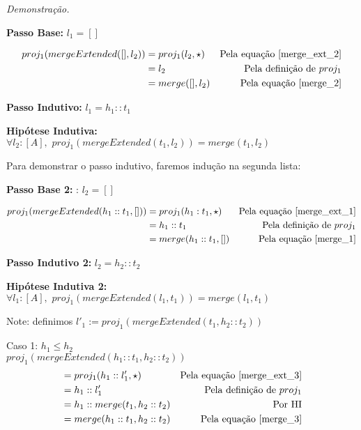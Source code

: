 \documentclass[12pt, oneside, a4paper,english,brazil]{abntex2}
\begin{document}
\noindent \textit{Demonstra\c{c}\~ao.}

\textbf{Passo Base: } $l_{1} = []$

\begin{align*}
  proj_{1}(mergeExtended([], l_{2})) &= proj_{1}(l_{2}, \star) &\text{Pela equa\c{c}\~ao \ref{merge_ext_2}} \\
  &= l_{2} &\text{Pela defini\c{c}\~ao de } proj_1\\
  &= merge([], l_{2}) &\text{Pela equa\c{c}\~ao \ref{merge_2}}
\end{align*}

\textbf{Passo Indutivo: } $l_{1} = h_{1} :: t_{1}$

\textbf{Hip\'otese Indutiva: } $\forall l_{2} : [A], \,\, proj_{1}(mergeExtended(t_{1}, l_{2})) = merge(t_{1}, l_{2})$

Para demonstrar o passo indutivo, faremos indu\c{c}\~ao na segunda lista:

\textbf{Passo Base 2: }: $l_{2} = []$

\begin{align*}
  proj_{1}(mergeExtended(h_{1} :: t_{1}, [])) &= proj_{1}(h_{1} : t_{1}, \star) &\text{Pela equa\c{c}\~ao \ref{merge_ext_1}} \\
  &= h_{1} :: t_{1} &\text{Pela defini\c{c}\~ao de } proj_1 \\
  &= merge(h_{1} :: t_{1}, []) &\text{Pela equa\c{c}\~ao \ref{merge_1}}
\end{align*}

\textbf{Passo Indutivo 2: } $l_{2} = h_{2} :: t_{2}$

\textbf{Hip\'otese Indutiva 2: } $\forall l_{1} : [A], \,\, proj_{1}(mergeExtended(l_{1}, t_{1})) = merge(l_{1}, t_{1})$

Note: definimos $l'_{1} := proj_{1}(mergeExtended(t_{1}, h_{2} :: t_{2}))$

Caso 1: $h_{1} \le h_{2}$\\

$ proj_{1}(mergeExtended(h_{1} :: t_{1}, h_{2} :: t_{2})) $
\begin{align*}
 &= proj_{1}(h_{1} :: l'_{1}, \star) &\text{Pela equa\c{c}\~ao \ref{merge_ext_3}} \\
                                                          &= h_{1} :: l'_{1} &\text{Pela defini\c{c}\~ao de $proj_{1}$} \\
  &= h_{1} :: merge(t_{1}, h_{2} :: t_{2}) &\text{Por HI} \\
  &= merge(h_{1} :: t_{1}, h_{2} :: t_{2}) &\text{Pela equa\c{c}\~ao \ref{merge_3}}
\end{align*}
\end{document}
